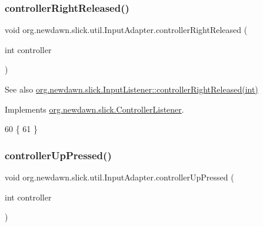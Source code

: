 \subsubsection{\texorpdfstring{controller\+Right\+Released()}{controllerRightReleased()}}
{\footnotesize\ttfamily void org.\+newdawn.\+slick.\+util.\+Input\+Adapter.\+controller\+Right\+Released (\begin{DoxyParamCaption}\item[{int}]{controller }\end{DoxyParamCaption})\hspace{0.3cm}{\ttfamily [inline]}}

\begin{DoxySeeAlso}{See also}
\mbox{\hyperlink{interfaceorg_1_1newdawn_1_1slick_1_1_controller_listener_a33ee418e010e69783169b3f52fb62c3b}{org.\+newdawn.\+slick.\+Input\+Listener\+::controller\+Right\+Released(int)}} 
\end{DoxySeeAlso}


Implements \mbox{\hyperlink{interfaceorg_1_1newdawn_1_1slick_1_1_controller_listener_a33ee418e010e69783169b3f52fb62c3b}{org.\+newdawn.\+slick.\+Controller\+Listener}}.


\begin{DoxyCode}
60                                                         \{
61     \}
\end{DoxyCode}
\mbox{\label{classorg_1_1newdawn_1_1slick_1_1util_1_1_input_adapter_ae4728619a49e096201282b048c6b11df}} 
\subsubsection{\texorpdfstring{controller\+Up\+Pressed()}{controllerUpPressed()}}
{\footnotesize\ttfamily void org.\+newdawn.\+slick.\+util.\+Input\+Adapter.\+controller\+Up\+Pressed (\begin{DoxyParamCaption}\item[{int}]{controller }\end{DoxyParamCaption})\hspace{0.3cm}{\ttfamily [inline]}}

